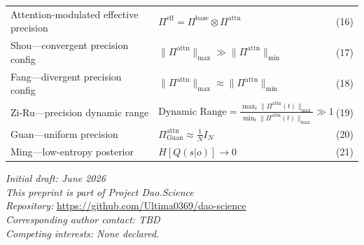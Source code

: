 \documentclass[11pt,a4paper]{article}
\begin{document}
\begin{longtable}{@{}p{4.5cm}p{8.5cm}p{1.5cm}@{}}
Attention-modulated effective precision & $\Pi^{\text{eff}} = \Pi^{\text{base}} \otimes \Pi^{\text{attn}}$ & (16) \\
\addlinespace
Shou---convergent precision config & $\|\Pi^{\text{attn}}\|_{\text{max}} \gg \|\Pi^{\text{attn}}\|_{\text{min}}$ & (17) \\
\addlinespace
Fang---divergent precision config & $\|\Pi^{\text{attn}}\|_{\text{max}} \approx \|\Pi^{\text{attn}}\|_{\text{min}}$ & (18) \\
\addlinespace
Zi-Ru---precision dynamic range & $\text{Dynamic Range} = \frac{\max_t \|\Pi^{\text{attn}}(t)\|_{\text{max}}}{\min_t \|\Pi^{\text{attn}}(t)\|_{\text{max}}} \gg 1$ & (19) \\
\addlinespace
Guan---uniform precision & $\Pi^{\text{attn}}_{\text{Guan}} \approx \frac{1}{N} I_N$ & (20) \\
\addlinespace
Ming---low-entropy posterior & $H[Q(s|o)] \to 0$ & (21) \\
\bottomrule
\end{longtable}

\vspace{12pt}
\noindent\textit{Initial draft: June 2026}\\
\textit{This preprint is part of Project Dao.Science}\\
\textit{Repository:} \url{https://github.com/Ultima0369/dao-science}\\
\textit{Corresponding author contact: TBD}\\
\textit{Competing interests: None declared.}
\end{document}
